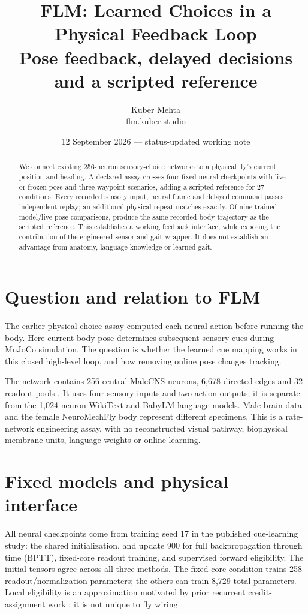 \documentclass[10pt]{article}
\title{\textbf{FLM: Learned Choices in a Physical Feedback Loop}\\[6pt]\large Pose feedback, delayed decisions and a scripted reference}
\author{Kuber Mehta\\\href{https://flm.kuber.studio}{flm.kuber.studio}}
\date{12 September 2026 --- status-updated working note}
\begin{document}
\maketitle
\begin{abstract}
We connect existing 256-neuron sensory-choice networks to a physical fly's
current position and heading. A declared assay crosses four fixed neural
checkpoints with live or frozen pose and three waypoint scenarios, adding a
scripted reference for 27 conditions. Every recorded sensory input, neural
frame and delayed command passes independent replay; an additional physical
repeat matches exactly. Of nine trained-model/live-pose comparisons,
\FeedbackEquivalentCount{} produce the same recorded body trajectory as the
scripted reference. This establishes a working feedback interface, while
exposing the contribution of the engineered sensor and gait wrapper. It does
not establish an advantage from anatomy, language knowledge or learned gait.
\end{abstract}

\section{Question and relation to FLM}
The earlier physical-choice assay computed each neural action before running
the body. Here current body pose determines subsequent sensory cues during
MuJoCo simulation. The question is whether the learned cue mapping works in
this closed high-level loop, and how removing online pose changes tracking.

The network contains 256 central MaleCNS neurons, 6,678 directed edges and 32
readout pools \cite{malecns}. It uses four sensory inputs and two action outputs;
it is separate from the 1,024-neuron WikiText and BabyLM language models.
Male brain data and the female NeuroMechFly body represent different specimens.
This is a rate-network engineering assay, with no reconstructed visual pathway,
biophysical membrane units, language weights or online learning.

\section{Fixed models and physical interface}
All neural checkpoints come from training seed 17 in the published cue-learning
study: the shared initialization, and update 900 for full backpropagation through
time (BPTT), fixed-core readout training, and supervised forward eligibility.
The initial tensors agree across all three methods. The fixed-core condition
trains 258 readout/normalization parameters; the others can train 8,729 total
parameters. Local eligibility is an approximation motivated by prior recurrent
credit-assignment work \cite{bellec}; it is not unique to fly wiring.
\end{document}
